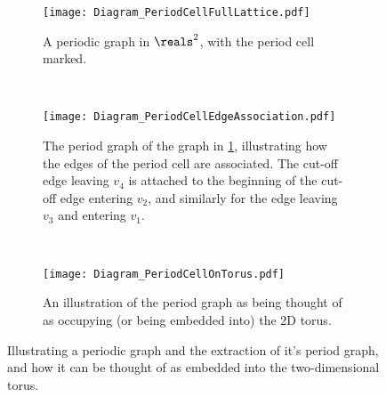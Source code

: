 \begin{figure}[h!]
	\centering
	\begin{subfigure}[t]{0.45\textwidth}
		\centering
		\texttt{[image: Diagram\_PeriodCellFullLattice.pdf]}
		\caption{\label{fig:Diagram_PeriodCellFullLattice} A periodic graph in $\reals^2$, with the period cell marked.}
	\end{subfigure}
	~
	\begin{subfigure}[t]{0.45\textwidth}
		\centering
		\texttt{[image: Diagram\_PeriodCellEdgeAssociation.pdf]}
		\caption{\label{fig:Diagram_PeriodCellEdgeAssociation} The period graph of the graph in \ref{fig:Diagram_PeriodCellFullLattice}, illustrating how the edges of the period cell are associated. The cut-off edge leaving $v_4$ is attached to the beginning of the cut-off edge entering $v_2$, and similarly for the edge leaving $v_3$ and entering $v_1$.}
	\end{subfigure}
	\\
	\begin{subfigure}[b]{0.75\textwidth}
		\centering
		\texttt{[image: Diagram\_PeriodCellOnTorus.pdf]}
		\caption{\label{fig:Diagram_PeriodCellOnTorus} An illustration of the period graph as being thought of as occupying (or being embedded into) the 2D torus.}
	\end{subfigure}
	\caption{\label{fig:PeriodCellIllustration} Illustrating a periodic graph and the extraction of it's period graph, and how it can be thought of as embedded into the two-dimensional torus.}
\end{figure}

